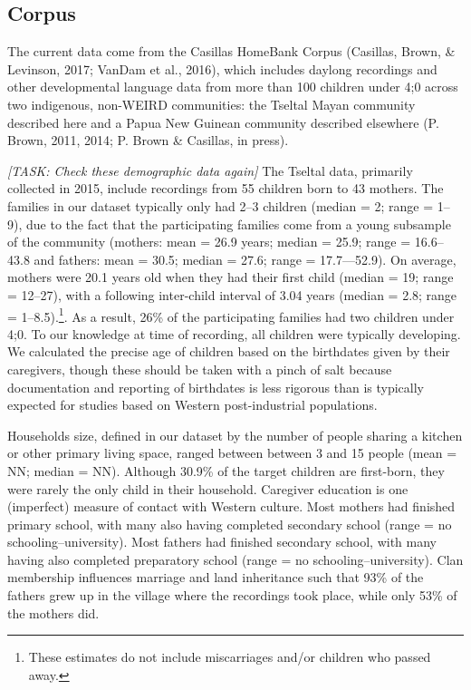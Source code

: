 \documentclass[floatsintext,man]{apa6}
\theoremstyle{definition}
\theoremstyle{definition}
\theoremstyle{definition}
\theoremstyle{remark}
\begin{document}
\subsection{Corpus}\label{methods-corpus}

The current data come from the Casillas HomeBank Corpus (Casillas,
Brown, \& Levinson, 2017; VanDam et al., 2016), which includes daylong
recordings and other developmental language data from more than 100
children under 4;0 across two indigenous, non-WEIRD communities: the
Tseltal Mayan community described here and a Papua New Guinean community
described elsewhere (P. Brown, 2011, 2014; P. Brown \& Casillas, in
press).

\emph{{[}TASK: Check these demographic data again{]}} The Tseltal data,
primarily collected in 2015, include recordings from 55 children born to
43 mothers. The families in our dataset typically only had 2--3 children
(median = 2; range = 1--9), due to the fact that the participating
families come from a young subsample of the community (mothers: mean =
26.9 years; median = 25.9; range = 16.6--43.8 and fathers: mean = 30.5;
median = 27.6; range = 17.7---52.9). On average, mothers were 20.1 years
old when they had their first child (median = 19; range = 12--27), with
a following inter-child interval of 3.04 years (median = 2.8; range =
1--8.5).\footnote{These estimates do not include miscarriages and/or children who passed away.}.
As a result, 26\% of the participating families had two children under
4;0. To our knowledge at time of recording, all children were typically
developing. We calculated the precise age of children based on the
birthdates given by their caregivers, though these should be taken with
a pinch of salt because documentation and reporting of birthdates is
less rigorous than is typically expected for studies based on Western
post-industrial populations.

Households size, defined in our dataset by the number of people sharing
a kitchen or other primary living space, ranged between between 3 and 15
people (mean = NN; median = NN). Although 30.9\% of the target children
are first-born, they were rarely the only child in their household.
Caregiver education is one (imperfect) measure of contact with Western
culture. Most mothers had finished primary school, with many also having
completed secondary school (range = no schooling--university). Most
fathers had finished secondary school, with many having also completed
preparatory school (range = no schooling--university). Clan membership
influences marriage and land inheritance such that 93\% of the fathers
grew up in the village where the recordings took place, while only 53\%
of the mothers did.
\end{document}

